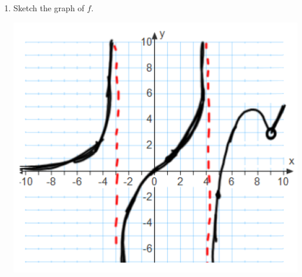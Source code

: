 \documentclass[nooutcomes,handout]{ximera}
\begin{document}
\begin{problem}
\begin{freeResponse}
\begin{enumerate}
			
      \item
        Sketch the graph of $f$.
        \begin{image}
          \includegraphics[scale=.55]{Figure5.png}
	\end{image}
    \end{enumerate}
  \end{freeResponse}
\end{problem}
\end{document}
